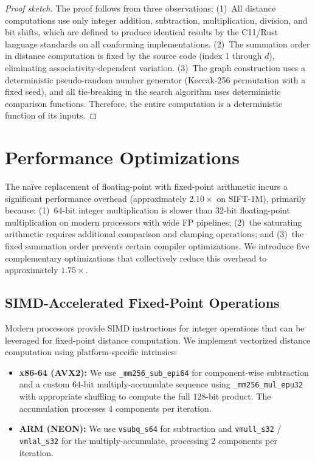 \documentclass[10pt,journal,compsoc]{IEEEtran}
\begin{document}
\begin{proof}[Proof sketch]
The proof follows from three observations: (1)~All distance computations use only integer addition, subtraction, multiplication, division, and bit shifts, which are defined to produce identical results by the C11/Rust language standards on all conforming implementations. (2)~The summation order in distance computation is fixed by the source code (index 1 through $d$), eliminating associativity-dependent variation. (3)~The graph construction uses a deterministic pseudo-random number generator (Keccak-256 permutation with a fixed seed), and all tie-breaking in the search algorithm uses deterministic comparison functions. Therefore, the entire computation is a deterministic function of its inputs.
\end{proof}


\section{Performance Optimizations}
\label{sec:optimizations}

The na\"ive replacement of floating-point with fixed-point arithmetic incurs a significant performance overhead (approximately $2.10\times$ on SIFT-1M), primarily because: (1)~64-bit integer multiplication is slower than 32-bit floating-point multiplication on modern processors with wide FP pipelines; (2)~the saturating arithmetic requires additional comparison and clamping operations; and (3)~the fixed summation order prevents certain compiler optimizations. We introduce five complementary optimizations that collectively reduce this overhead to approximately $1.75\times$.

\subsection{SIMD-Accelerated Fixed-Point Operations}

Modern processors provide SIMD instructions for integer operations that can be leveraged for fixed-point distance computation. We implement vectorized distance computation using platform-specific intrinsics:

\begin{itemize}[leftmargin=*]
  \item \textbf{x86-64 (AVX2):} We use \texttt{\_mm256\_sub\_epi64} for component-wise subtraction and a custom 64-bit multiply-accumulate sequence using \texttt{\_mm256\_mul\_epu32} with appropriate shuffling to compute the full 128-bit product. The accumulation processes 4 components per iteration.

  \item \textbf{ARM (NEON):} We use \texttt{vsubq\_s64} for subtraction and \texttt{vmull\_s32} / \texttt{vmlal\_s32} for the multiply-accumulate, processing 2 components per iteration.
\end{itemize}
\end{document}
